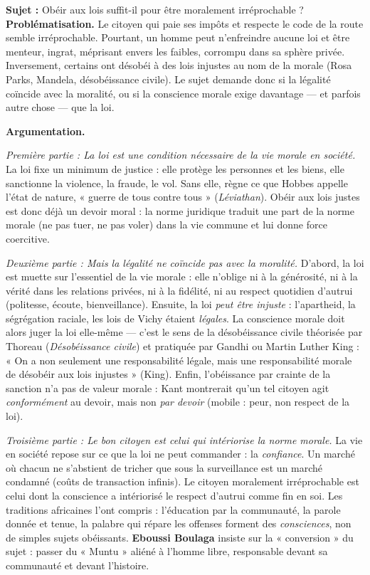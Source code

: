 \documentclass[11pt]{article}
\begin{document}
\begin{exoresolu}
\textbf{Sujet :} Obéir aux lois suffit-il pour être moralement irréprochable ?
\tcblower
\textbf{Problématisation.} Le citoyen qui paie ses impôts et respecte le code de la route semble irréprochable. Pourtant, un homme peut n'enfreindre aucune loi et être menteur, ingrat, méprisant envers les faibles, corrompu dans sa sphère privée. Inversement, certains ont désobéi à des lois injustes au nom de la morale (Rosa Parks, Mandela, désobéissance civile). Le sujet demande donc si la légalité coïncide avec la moralité, ou si la conscience morale exige davantage — et parfois autre chose — que la loi.

\textbf{Argumentation.}

\emph{Première partie : La loi est une condition nécessaire de la vie morale en société.} La loi fixe un minimum de justice : elle protège les personnes et les biens, elle sanctionne la violence, la fraude, le vol. Sans elle, règne ce que Hobbes appelle l'état de nature, « guerre de tous contre tous » (\emph{Léviathan}). Obéir aux lois justes est donc déjà un devoir moral : la norme juridique traduit une part de la norme morale (ne pas tuer, ne pas voler) dans la vie commune et lui donne force coercitive.

\emph{Deuxième partie : Mais la légalité ne coïncide pas avec la moralité.} D'abord, la loi est muette sur l'essentiel de la vie morale : elle n'oblige ni à la générosité, ni à la vérité dans les relations privées, ni à la fidélité, ni au respect quotidien d'autrui (politesse, écoute, bienveillance). Ensuite, la loi \emph{peut être injuste} : l'apartheid, la ségrégation raciale, les lois de Vichy étaient \emph{légales}. La conscience morale doit alors juger la loi elle-même — c'est le sens de la désobéissance civile théorisée par Thoreau (\emph{Désobéissance civile}) et pratiquée par Gandhi ou Martin Luther King : « On a non seulement une responsabilité légale, mais une responsabilité morale de désobéir aux lois injustes » (King). Enfin, l'obéissance par crainte de la sanction n'a pas de valeur morale : Kant montrerait qu'un tel citoyen agit \emph{conformément} au devoir, mais non \emph{par devoir} (mobile : peur, non respect de la loi).

\emph{Troisième partie : Le bon citoyen est celui qui intériorise la norme morale.} La vie en société repose sur ce que la loi ne peut commander : la \emph{confiance}. Un marché où chacun ne s'abstient de tricher que sous la surveillance est un marché condamné (coûts de transaction infinis). Le citoyen moralement irréprochable est celui dont la conscience a intériorisé le respect d'autrui comme fin en soi. Les traditions africaines l'ont compris : l'éducation par la communauté, la parole donnée et tenue, la palabre qui répare les offenses forment des \emph{consciences}, non de simples sujets obéissants. \textbf{Eboussi Boulaga} insiste sur la « conversion » du sujet : passer du « Muntu » aliéné à l'homme libre, responsable devant sa communauté et devant l'histoire.


\end{exoresolu}
\end{document}
